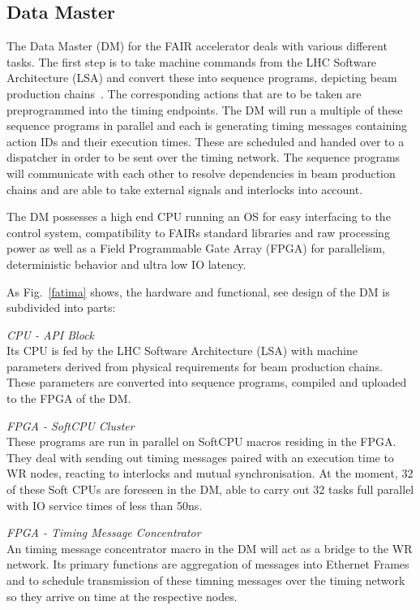 \documentclass{JAC2003}
\begin{document}
\subsection{Data Master}

The Data Master (DM) for the FAIR accelerator
deals with various different tasks. The first step is to
take machine commands from the LHC Software Architecture (LSA) and convert these 
into sequence programs, depicting beam production chains~\cite{dm}.
The corresponding actions that are to be taken are preprogrammed into the timing endpoints. The DM will run
a multiple of these sequence programs in parallel and
each is generating timing messages containing action
IDs and their execution times. These are scheduled and
handed over to a dispatcher in order to be sent over the timing
network. The sequence programs will communicate with each other to
resolve dependencies in beam production chains and
are able to take external signals and interlocks into
account.

The DM possesses a high end CPU running an
OS for easy interfacing to the control system, compatibility to 
FAIRs standard libraries and raw processing power as well as a 
Field Programmable Gate Array (FPGA) for parallelism, deterministic 
behavior and ultra low IO latency.

As Fig.~\ref{fatima} shows, the hardware and functional, see design of the DM is subdivided into
parts:

\textit{CPU - API Block} \\
Its CPU is fed by the LHC Software
Architecture (LSA) with machine parameters derived from
physical requirements for beam production chains. These
parameters are converted into sequence programs,
compiled and uploaded to the FPGA of the DM.

\textit{FPGA - SoftCPU Cluster} \\
These programs are run in
parallel on SoftCPU macros residing in the FPGA. They
deal with sending out timing messages paired with an execution time to WR nodes, 
reacting to interlocks and mutual synchronisation. At the moment, 32 of these Soft CPUs are
foreseen in the DM, able to carry out 32 tasks full parallel with IO service times of less than 50ns.

\textit{FPGA - Timing Message Concentrator} \\
An timing message concentrator macro in the DM will act as a bridge to the WR
network. Its primary functions are aggregation of messages
into Ethernet Frames and to schedule transmission of these
timning messages over the timing network so they arrive on
time at the respective nodes. 
\end{document}
